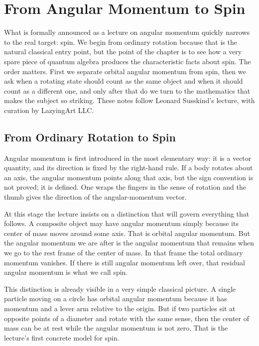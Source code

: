 \chapter{From Angular Momentum to Spin}

What is formally announced as a lecture on angular momentum quickly narrows to the real target: spin. We begin from ordinary rotation because that is the natural classical entry point, but the point of the chapter is to see how a very spare piece of quantum algebra produces the characteristic facts about spin. The order matters. First we separate orbital angular momentum from spin, then we ask when a rotating state should count as the same object and when it should count as a different one, and only after that do we turn to the mathematics that makes the subject so striking. These notes follow Leonard Susskind's lecture, with curation by LazyingArt LLC.

\section{From Ordinary Rotation to Spin}

Angular momentum is first introduced in the most elementary way: it is a vector quantity, and its direction is fixed by the right-hand rule. If a body rotates about an axis, the angular momentum points along that axis, but the sign convention is not proved; it is defined. One wraps the fingers in the sense of rotation and the thumb gives the direction of the angular-momentum vector.

At this stage the lecture insists on a distinction that will govern everything that follows. A composite object may have angular momentum simply because its center of mass moves around some axis. That is orbital angular momentum. But the angular momentum we are after is the angular momentum that remains when we go to the rest frame of the center of mass. In that frame the total ordinary momentum vanishes. If there is still angular momentum left over, that residual angular momentum is what we call spin.

This distinction is already visible in a very simple classical picture. A single particle moving on a circle has orbital angular momentum because it has momentum and a lever arm relative to the origin. But if two particles sit at opposite points of a diameter and rotate with the same sense, then the center of mass can be at rest while the angular momentum is not zero. That is the lecture's first concrete model for spin.

